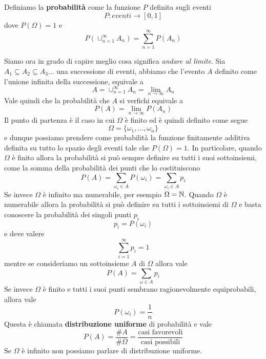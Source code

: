 \begin{definition}
	Definiamo la \textbf{probabilità} come la funzione $P$ definita sugli eventi
	\[ P : eventi \to [0, 1] \]
	dove $P(\Omega) = 1$ e
	\[ P(\cup_{n=1}^\infty A_n) = \sum_{n=1}^\infty P(A_n) \]
\end{definition}

Siamo ora in grado di capire meglio cosa significa \emph{andare al limite}. Sia
$A_1 \subseteq A_2 \subseteq A_3 \dots$ una successione di eventi, abbiamo che l'evento $A$ definito come
l'unione infinita della successione, equivale a
\[ A = \cup_{n=1}^\infty A_n = \lim_{n \to \infty} A_n \]
Vale quindi che la probabilità che $A$ si verfichi equivale a
\[ P(A) = \lim_{n \to \infty} P(A_n) \]
Il punto di partenza è il caso in cui $\Omega$ è finito ed è quindi definito come segue
\[ \Omega = \{ \omega_1, \dots, \omega_n \} \]
e dunque possiamo prendere come probabilità la funzione finitamente additiva definita su tutto lo spazio
degli eventi tale che $P(\Omega) = 1$. In particolare, quando $\Omega$ è finito allora la probabilità si
può sempre definire su tutti i suoi sottoinsiemi, come la somma della probabilità dei punti che lo
costituiscono
\[ P(A) = \sum_{\omega_i \in A} P(\omega_i) = \sum_{\omega_i \in A} p_i \]
Se invece $\Omega$ è infinito ma numerabile, per esempio $\Omega = \mathbb{N}$. Quando $\Omega$ è numerabile allora
la probabilità si può definire su tutti i sottoinsiemi di $\Omega$ e basta conoscere la probabilità dei
singoli punti $p_i$
\[ p_i = P(\omega_i) \]
e deve valere
\[ \sum_{i=1}^\infty p_i = 1 \]
mentre se consideriamo un sottoinsieme $A$ di $\Omega$ allora vale
\[ P(A) = \sum_{\omega \in A} p_i \]
Se invece $\Omega$ è finito e tutti i suoi punti sembrano ragionevolmente equiprobabili, allora vale
\[ P(\omega_i) = \frac{1}{n} \]
Questa è chiamata \textbf{distribuzione uniforme} di probabilità e vale
\[ P(A) = \frac{\# A}{\# \Omega} = \frac{\text{casi favorevoli}}{\text{casi possibili}} \]
Se $\Omega$ è infinito non possiamo parlare di distribuzione uniforme.
